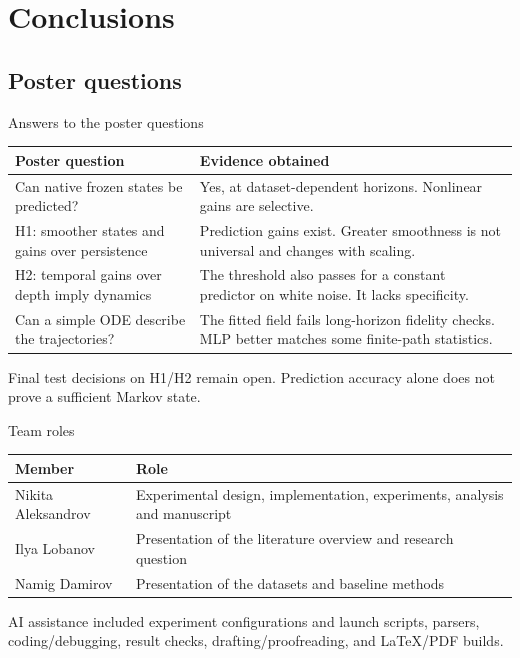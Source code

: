 \documentclass[aspectratio=169,11pt]{beamer}
\begin{document}
\section{Conclusions}
\subsection{Poster questions}
\begin{frame}{Answers to the poster questions}
\begin{table}
\centering\small
\begin{tabular}{p{}p{}}
\toprule
Poster question & Evidence obtained \\
\midrule
Can native frozen states be predicted? & Yes, at dataset-dependent horizons. Nonlinear gains are selective. \\
H1: smoother states and gains over persistence & Prediction gains exist. Greater smoothness is not universal and changes with scaling. \\
H2: temporal gains over depth imply dynamics & The threshold also passes for a constant predictor on white noise. It lacks specificity. \\
Can a simple ODE describe the trajectories? & The fitted field fails long-horizon fidelity checks. MLP better matches some finite-path statistics. \\
\bottomrule
\end{tabular}
\end{table}
Final test decisions on H1/H2 remain open. Prediction accuracy alone does not prove a sufficient Markov state.
\end{frame}

\begin{frame}{Team roles}
\begin{table}
\centering
\renewcommand{\arraystretch}{1.4}
\begin{tabular}{p{}p{}}
\toprule
Member & Role \\
\midrule
Nikita Aleksandrov & Experimental design, implementation, experiments, analysis and manuscript \\
Ilya Lobanov & Presentation of the literature overview and research question \\
Namig Damirov & Presentation of the datasets and baseline methods \\
\bottomrule
\end{tabular}
\end{table}
\vspace{2mm}
{\scriptsize AI assistance included experiment configurations and launch scripts, parsers, coding/debugging, result checks, drafting/proofreading, and LaTeX/PDF builds.}
\end{frame}
\end{document}
